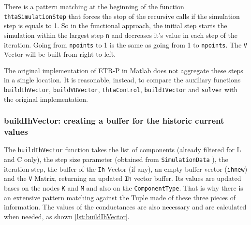 There is a pattern matching at the beginning of the function \lstinline!thtaSimulationStep! that forces the stop of the recursive calls if the simulation step is equals to 1. So in the functional approach, the initial step starts the simulation within the largest step \lstinline!n! and decreases it's value in each step of the iteration. Going from \lstinline!npoints! to 1 is the same as going from 1 to \lstinline!npoints!. The \lstinline!V! Vector will be built from right to left.

The original implementation of ETR-P in Matlab does not aggregate these steps in a single location. It is reasonable, instead, to compare the auxiliary functions \lstinline!buildIhVector!, \lstinline!buildVBVector!, \lstinline!thtaControl!, \lstinline!buildIVector! and \lstinline!solver! with the original implementation.

\subsubsection{ buildIhVector: creating a buffer for the historic current values }

The \lstinline!buildIhVector! function takes the list of components (already filtered for L and C only), the step size parameter (obtained from \lstinline!SimulationData! ), the iteration step, the buffer of the \lstinline!Ih! Vector (if any), an empty buffer vector (\lstinline!ihnew!) and the \lstinline!V! Matrix, returning an updated \lstinline!Ih! vector buffer. Its values are updated bases on the nodes \lstinline!K! and \lstinline!M! and also on the \lstinline!ComponentType!. That is why there is an extensive pattern matching against the Tuple made of these three pieces of information.  The values of the conductances are also necessary and are calculated when needed, as shown \cref{lst:buildIhVector}.

